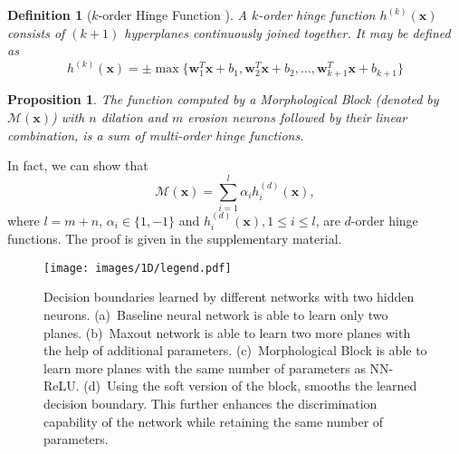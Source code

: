 \documentclass{bmvc2k}
\newtheorem{proposition}{Proposition}
\newtheorem{definition}{Definition}
\def\vw{{\bm{w}}}
\def\vx{{\bm{x}}}
\begin{document}
\begin{definition}[$k$-order Hinge Function \cite{wang2005generalization}]
    A $k$-order hinge function $h^{(k)}(\vx)$ consists of $(k+1)$ hyperplanes continuously joined together. It may be defined as 
    \begin{equation}
        h^{(k)}(\vx) = \pm \max\{\vw_1^{T}\vx+b_1, \vw_2^{T}\vx+b_2, \ldots, \vw_{k+1}^{T}\vx+b_{k+1}\} 
        \label{eq:k-order_hinge}
    \end{equation}
\end{definition}


\begin{proposition}
\label{th:gx_sum_hinge}
The function computed by a Morphological Block (denoted by $\mathcal{M}(\vx)$) with $n$ dilation and $m$ erosion neurons followed by their linear combination, is a sum of multi-order hinge functions.
\end{proposition}
\noindent In fact, we can show that 
\begin{equation}
    \mathcal{M}(\vx) = \sum_{i=1}^{l} \alpha_{i} h^{(d)}_i(\vx), \label{eq:lemma_sum_of_hinge}
\end{equation}
where $l=m+n$, $\alpha_{i} \in \{1,-1\}$ and $h^{(d)}_i(\vx), 1 \le i \le l$, are $d$-order hinge functions. The proof is given in the supplementary material.

\begin{figure}
    \centering
    \texttt{[image: images/1D/legend.pdf]}
    \smallskip
    
\caption{Decision boundaries learned by different networks with two hidden neurons. (a)~Baseline neural network is able to learn only two planes. 
(b)~Maxout network is able to learn two more planes with the help of additional parameters. 
(c)~Morphological Block is able to learn more planes with the same number of parameters as NN-ReLU. 
(d)~Using the soft version of the block, smooths the learned decision boundary. 
This further enhances the discrimination capability of the network while retaining the same number of parameters.}
    \label{fig:pmap_circle}
\end{figure}
\end{document}
